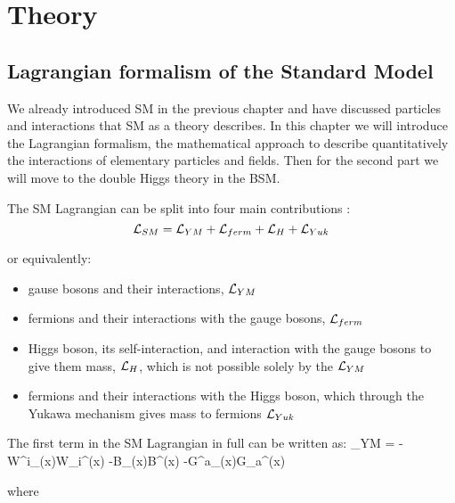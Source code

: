 
\chapter{Theory}
\label{ch:theory}

\section{Lagrangian formalism of the Standard Model}
We already introduced SM in the previous chapter and have discussed particles and interactions that SM as a theory describes. In this chapter we will introduce the Lagrangian formalism, the mathematical approach to describe quantitatively the interactions of elementary particles and fields. Then for the second part we will move to the double Higgs theory in the BSM.

The SM Lagrangian can be split into four main contributions \cite{Mozer:2016wzi}:
\begin{equation}\label{lagr_SM}
\mathcal{L}_{SM} = \mathcal{L}_{YM} + \mathcal{L}_{ferm} + \mathcal{L}_{H} + \mathcal{L}_{Yuk} 
\end{equation}

or equivalently:

\begin{itemize}
\item gause bosons and their interactions, $\mathcal{L}_{YM} $
\item fermions and their interactions with the gauge bosons, $\mathcal{L}_{ferm}$
\item Higgs boson, its self-interaction, and interaction with the gauge bosons to give them mass, $\mathcal{L}_{H}$, which is not possible solely by the $\mathcal{L}_{YM}$
\item fermions and their interactions with the Higgs boson, which through the Yukawa mechanism gives mass to fermions $\mathcal{L}_{Yuk} $
\end{itemize}
 


The first term in the SM Lagrangian in full can be written as:
\beqn\label{lagr_YM}
\Lagr_{YM} = 	-W^i_{\mu\nu}(x)W_i^{\mu\nu}(x) -B_{\mu\nu}(x)B^{\mu\nu}(x) -G^a_{\mu\nu}(x)G_a^{\mu\nu}(x)
\eeqn

where

